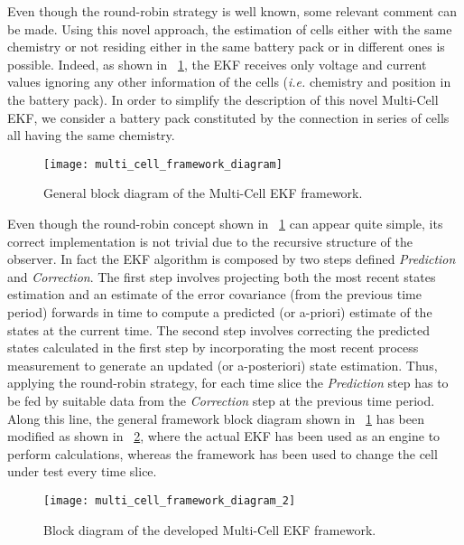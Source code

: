 \documentclass[journal]{IEEEtran}
\begin{document}
Even though the round-robin strategy is well known, some relevant comment can be made.
Using this novel approach, the estimation of cells either with the same chemistry or not residing either in the same battery pack or in different ones is possible.
Indeed, as shown in \figurename~\ref{fig::multi_cell_framework_diagram}, the EKF receives only voltage and current values ignoring any other information of the cells (\textit{i.e.} chemistry and position in the battery pack).
In order to simplify the description of this novel Multi-Cell EKF, we consider a battery pack constituted by the connection in series of cells all having the same chemistry.
\begin{figure}[!htbp]
	\centering
		\texttt{[image: multi\_cell\_framework\_diagram]}
	\caption{General block diagram of the Multi-Cell EKF framework.}
	\label{fig::multi_cell_framework_diagram}
\end{figure}


Even though the round-robin concept shown in \figurename~\ref{fig::multi_cell_framework_diagram} can appear quite simple, its correct implementation is not trivial due to the recursive structure of the observer. 
In fact the EKF algorithm is composed by two steps defined \textit{Prediction} and \textit{Correction}.
The first step involves projecting both the most recent states estimation and an estimate of the error covariance (from the previous time period) forwards in time to compute a predicted (or a-priori) estimate of the states at the current time. The second step involves correcting the predicted states calculated in the first step by incorporating the most recent process measurement to generate an updated (or a-posteriori) state estimation.
Thus, applying the round-robin strategy, for each time slice the 
\textit{Prediction} step has to be fed by suitable data from the  \textit{Correction} step at the previous time period. 
Along this line, the general framework block diagram shown in \figurename~\ref{fig::multi_cell_framework_diagram} has been modified as shown in \figurename~\ref{fig::multi_cell_framework_diagram_2}, where the actual EKF has been used as an engine to perform calculations, whereas the framework has been used to change the cell under test every time slice.
\begin{figure}[!htbp]
	\centering
		\texttt{[image: multi\_cell\_framework\_diagram\_2]}
	\caption{Block diagram of the developed Multi-Cell EKF framework.}
	\label{fig::multi_cell_framework_diagram_2}
\end{figure}
\end{document}
